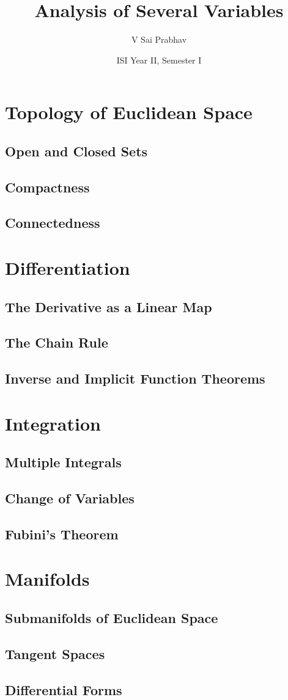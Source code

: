 \documentclass{book}
\title{Analysis of Several Variables}
\author{V Sai Prabhav}
\date{ISI Year II, Semester I}
\begin{document}
\maketitle

\chapter{Topology of Euclidean Space}
\section{Open and Closed Sets}
\section{Compactness}
\section{Connectedness}

\chapter{Differentiation}
\section{The Derivative as a Linear Map}
\section{The Chain Rule}
\section{Inverse and Implicit Function Theorems}

\chapter{Integration}
\section{Multiple Integrals}
\section{Change of Variables}
\section{Fubini's Theorem}

\chapter{Manifolds}
\section{Submanifolds of Euclidean Space}
\section{Tangent Spaces}
\section{Differential Forms}

\printindex
\end{document}
